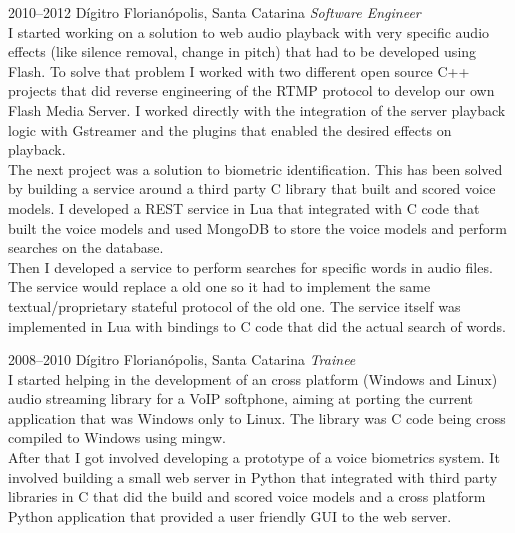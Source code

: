 \documentclass[]{friggeri-cv} %
\begin{document}
\begin{entrylist}
\entry
{2010--2012}
{Dígitro}
{Florianópolis, Santa Catarina}
{\emph{Software Engineer} \\

I started working on a solution to web audio playback
with very specific audio effects (like silence removal,
change in pitch) that had to be developed using Flash.
To solve that problem I worked with
two different open source C++ projects that did reverse
engineering of the RTMP protocol to develop our own
Flash Media Server. I worked directly with the integration
of the server playback logic with Gstreamer and the plugins
that enabled the desired effects on playback. \\

The next project was a solution to biometric identification.
This has been solved by building a service around a third party
C library that built and scored voice models.
I developed a REST service in Lua that integrated with C code
that built the voice models and used MongoDB to store the
voice models and perform searches on the database. \\

Then I developed a service to perform searches for specific
words in audio files. The service would replace a old one so
it had to implement the same textual/proprietary stateful protocol
of the old one. The service itself was implemented in Lua
with bindings to C code that did the actual search of
words. \\

}
\end{entrylist}
\begin{entrylist}
\entry
{2008--2010}
{Dígitro}
{Florianópolis, Santa Catarina}
{\emph{Trainee} \\

I started helping in the development of an
cross platform (Windows and Linux) audio streaming
library for a VoIP softphone, aiming at porting
the current application that was Windows only to Linux.
The library was C code being cross compiled to Windows using mingw.\\

After that I got involved developing a prototype of a voice
biometrics system. It involved building a small web server
in Python that integrated with third party libraries in C that did
the build and scored voice models and a cross platform
Python application that provided a user friendly GUI
to the web server.
}
\end{entrylist}
\end{document}
